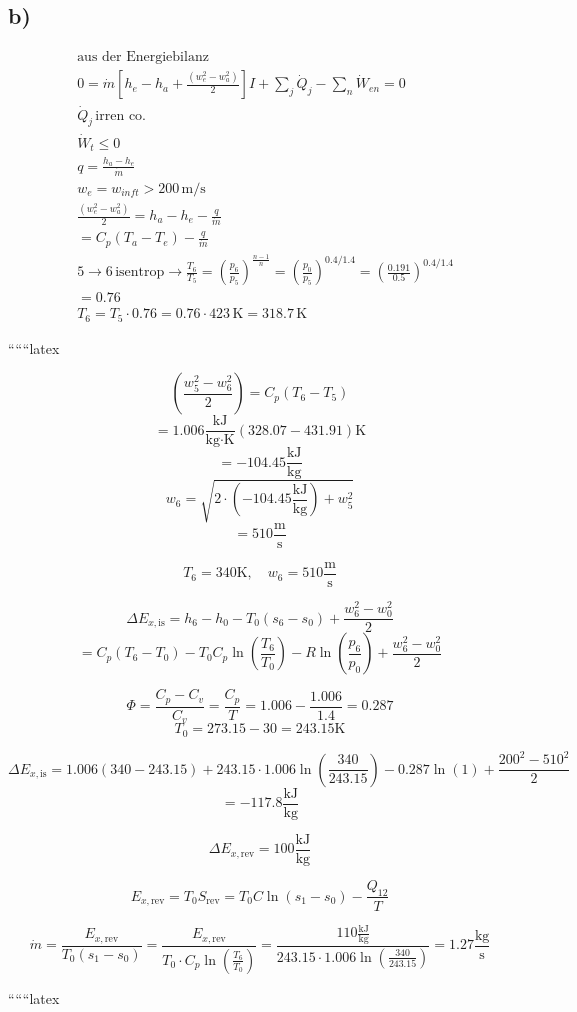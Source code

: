 

\subsection*{b)}

\begin{align*}
    &\text{aus der Energiebilanz} \\
    &0 = \dot{m} \left[ h_e - h_a + \frac{(w_e^2 - w_a^2)}{2} \right] I + \sum_j \dot{Q}_j - \sum_n \dot{W}_{en} = 0 \\
    &\dot{Q}_j \, \text{irren co.} \\
    &\dot{W}_t \leq 0 \\
    &q = \frac{h_a - h_e}{\dot{m}} \\
    &w_e = w_{inft} > 200 \, \text{m/s} \\
    &\frac{(w_e^2 - w_a^2)}{2} = h_a - h_e - \frac{q}{\dot{m}} \\
    &= C_p (T_a - T_e) - \frac{q}{\dot{m}} \\
    &5 \rightarrow 6 \, \text{isentrop} \rightarrow \frac{T_6}{T_5} = \left( \frac{p_6}{p_5} \right)^{\frac{n-1}{n}} = \left( \frac{p_0}{p_5} \right)^{0.4/1.4} = \left( \frac{0.191}{0.5} \right)^{0.4/1.4} \\
    &= 0.76 \\
    &T_6 = T_5 \cdot 0.76 = 0.76 \cdot 423 \, \text{K} = 318.7 \, \text{K}
\end{align*}

``````latex


\[
\left( \frac{w_5^2 - w_6^2}{2} \right) = C_p (T_6 - T_5)
\]
\[
= 1.006 \frac{\text{kJ}}{\text{kg} \cdot \text{K}} (328.07 - 431.91) \text{K}
\]
\[
= -104.45 \frac{\text{kJ}}{\text{kg}}
\]
\[
w_6 = \sqrt{2 \cdot (-104.45 \frac{\text{kJ}}{\text{kg}}) + w_5^2}
\]
\[
= 510 \frac{\text{m}}{\text{s}}
\]

\[
T_6 = 340 \text{K}, \quad w_6 = 510 \frac{\text{m}}{\text{s}}
\]

\[
\Delta E_{x, \text{is}} = h_6 - h_0 - T_0 (s_6 - s_0) + \frac{w_6^2 - w_0^2}{2}
\]
\[
= C_p (T_6 - T_0) - T_0 C_p \ln \left( \frac{T_6}{T_0} \right) - R \ln \left( \frac{p_6}{p_0} \right) + \frac{w_6^2 - w_0^2}{2}
\]

\[
\Phi = \frac{C_p - C_v}{C_v} = \frac{C_p}{T} = 1.006 - \frac{1.006}{1.4} = 0.287
\]
\[
T_0 = 273.15 - 30 = 243.15 \text{K}
\]

\[
\Delta E_{x, \text{is}} = 1.006 \left( 340 - 243.15 \right) + 243.15 \cdot 1.006 \ln \left( \frac{340}{243.15} \right) - 0.287 \ln \left( 1 \right) + \frac{200^2 - 510^2}{2}
\]
\[
= -117.8 \frac{\text{kJ}}{\text{kg}}
\]

\[
\Delta E_{x, \text{rev}} = 100 \frac{\text{kJ}}{\text{kg}}
\]

\[
E_{x, \text{rev}} = T_0 S_{\text{rev}} = T_0 C \ln (s_1 - s_0) - \frac{Q_{12}}{T}
\]

\[
\dot{m} = \frac{E_{x, \text{rev}}}{T_0 (s_1 - s_0)} = \frac{E_{x, \text{rev}}}{T_0 \cdot C_p \ln \left( \frac{T_6}{T_0} \right)} = \frac{110 \frac{\text{kJ}}{\text{kg}}}{243.15 \cdot 1.006 \ln \left( \frac{340}{243.15} \right)} = 1.27 \frac{\text{kg}}{\text{s}}
\]

``````latex